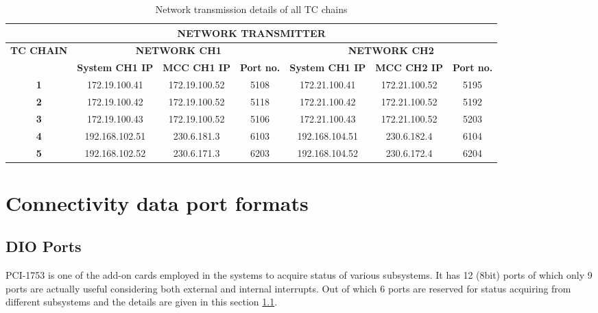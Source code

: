 \begin{longtable}[c]{|c|c|c|c|c|c|c|}
	\caption{Network transmission details of all TC chains }
	\label{Table:NetTxTcChains}\\
	\hline
	\multicolumn{7}{|c|}{\textbf{NETWORK TRANSMITTER}}                                                                                                      \\ \hline
	\endfirsthead
	\endhead
	\textbf{TC CHAIN} & \multicolumn{3}{c|}{\textbf{NETWORK CH1}}                        & \multicolumn{3}{c|}{\textbf{NETWORK CH2}}                        \\ \hline
	\textbf{}         & \textbf{System CH1 IP} & \textbf{MCC CH1 IP} & \textbf{Port no.} & \textbf{System CH1 IP} & \textbf{MCC CH2 IP} & \textbf{Port no.} \\ \hline
	\textbf{1}        & 172.19.100.41          & 172.19.100.52       & 5108              & 172.21.100.41          & 172.21.100.52       & 5195              \\ \hline
	\textbf{2}        & 172.19.100.42          & 172.19.100.52       & 5118              & 172.21.100.42          & 172.21.100.52       & 5192              \\ \hline
	\textbf{3}        & 172.19.100.43          & 172.19.100.52       & 5106              & 172.21.100.43          & 172.21.100.52       & 5203              \\ \hline
	\textbf{4}        & 192.168.102.51        & 230.6.181.3         & 6103              & 192.168.104.51        & 230.6.182.4         & 6104              \\ \hline
	\textbf{5}        & 192.168.102.52        & 230.6.171.3       & 6203                & 192.168.104.52            & 230.6.172.4       & 6204                \\ \hline
\end{longtable}


\section{Connectivity data port formats}
\label{Section:ConnectDataPortsFormat}
\subsection{DIO Ports}
\label{SectionDIOPorts}
PCI-1753 is one of the add-on cards  employed in the systems to acquire status of various subsystems. It has 12 (8bit) ports of which only 9 ports are actually useful considering both external and internal interrupts. Out of which 6 ports are reserved for status acquiring from different subsystems and the details are given in this section \ref{SectionDIOPorts}.\\

